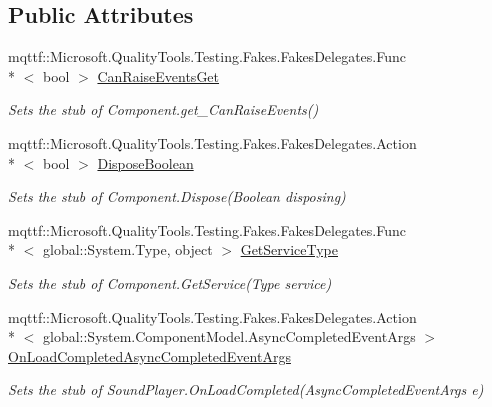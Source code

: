 \subsection*{Public Attributes}
\begin{DoxyCompactItemize}
\item 
mqttf\-::\-Microsoft.\-Quality\-Tools.\-Testing.\-Fakes.\-Fakes\-Delegates.\-Func\\*
$<$ bool $>$ \hyperlink{class_system_1_1_media_1_1_fakes_1_1_stub_sound_player_a89b4a35cfb88690f274943cc3eedaba2}{Can\-Raise\-Events\-Get}
\begin{DoxyCompactList}\small\item\em Sets the stub of Component.\-get\-\_\-\-Can\-Raise\-Events()\end{DoxyCompactList}\item 
mqttf\-::\-Microsoft.\-Quality\-Tools.\-Testing.\-Fakes.\-Fakes\-Delegates.\-Action\\*
$<$ bool $>$ \hyperlink{class_system_1_1_media_1_1_fakes_1_1_stub_sound_player_acc9c5231e58a3a6ab8fd65241ae264f6}{Dispose\-Boolean}
\begin{DoxyCompactList}\small\item\em Sets the stub of Component.\-Dispose(\-Boolean disposing)\end{DoxyCompactList}\item 
mqttf\-::\-Microsoft.\-Quality\-Tools.\-Testing.\-Fakes.\-Fakes\-Delegates.\-Func\\*
$<$ global\-::\-System.\-Type, object $>$ \hyperlink{class_system_1_1_media_1_1_fakes_1_1_stub_sound_player_ad4509025dea12a799a675b0ebe8c79a8}{Get\-Service\-Type}
\begin{DoxyCompactList}\small\item\em Sets the stub of Component.\-Get\-Service(\-Type service)\end{DoxyCompactList}\item 
mqttf\-::\-Microsoft.\-Quality\-Tools.\-Testing.\-Fakes.\-Fakes\-Delegates.\-Action\\*
$<$ global\-::\-System.\-Component\-Model.\-Async\-Completed\-Event\-Args $>$ \hyperlink{class_system_1_1_media_1_1_fakes_1_1_stub_sound_player_a468c97862a75c0b12aaaff9e5e272bb8}{On\-Load\-Completed\-Async\-Completed\-Event\-Args}
\begin{DoxyCompactList}\small\item\em Sets the stub of Sound\-Player.\-On\-Load\-Completed(\-Async\-Completed\-Event\-Args e)\end{DoxyCompactList}\item 

\end{DoxyCompactItemize}
